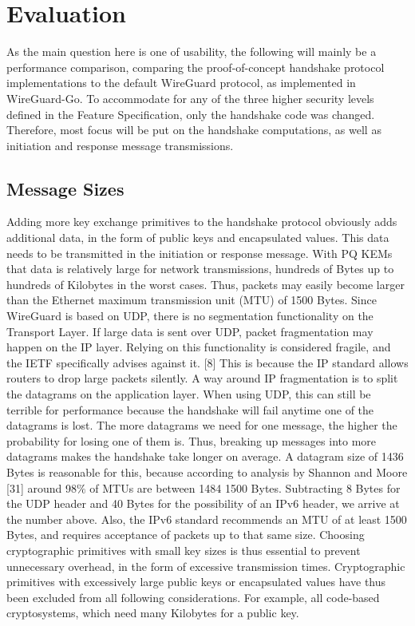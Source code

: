 \chapter{Evaluation}
\label{chap:Evaluation}

As the main question here is one of usability, the following will mainly be a performance comparison, comparing the proof-of-concept handshake protocol implementations to the default WireGuard protocol, as implemented in WireGuard-Go. To accommodate for any of the three higher security levels deﬁned in the Feature Speciﬁcation, only the handshake code was changed. Therefore, most focus will be put on the handshake computations, as well as initiation and response message transmissions.
\section{Message Sizes}
Adding more key exchange primitives to the handshake protocol obviously adds additional data, in the form of public keys and encapsulated values. This data needs to be transmitted in the initiation or response message.
With PQ KEMs that data is relatively large for network transmissions, hundreds of Bytes up to hundreds of Kilobytes in the worst cases. Thus, packets may easily become larger than the Ethernet maximum transmission unit (MTU) of 1500 Bytes.
Since WireGuard is based on UDP, there is no segmentation functionality on the Transport Layer. If large data is sent over UDP, packet fragmentation may happen on the IP layer. Relying on this functionality is considered fragile, and the IETF speciﬁcally advises against it. [8] This is because the IP standard allows routers to drop large packets silently.
A way around IP fragmentation is to split the datagrams on the application layer.
When using UDP, this can still be terrible for performance because the handshake will fail anytime one of the datagrams is lost. The more datagrams we need for one message, the higher the probability for losing one of them is. Thus, breaking up messages into more datagrams makes the handshake take longer on average.
A datagram size of 1436 Bytes is reasonable for this, because according to analysis by Shannon and Moore [31] around 98$\%$ of MTUs are between 1484 1500 Bytes.
Subtracting 8 Bytes for the UDP header and 40 Bytes for the possibility of an IPv6 header, we arrive at the number above. Also, the IPv6 standard recommends an MTU of at least 1500 Bytes, and requires acceptance of packets up to that same size. 
Choosing cryptographic primitives with small key sizes is thus essential to prevent unnecessary overhead, in the form of excessive transmission times. Cryptographic primitives with excessively large public keys or encapsulated values have thus been excluded from all following considerations. For example, all code-based cryptosystems, which need many Kilobytes for a public key.

